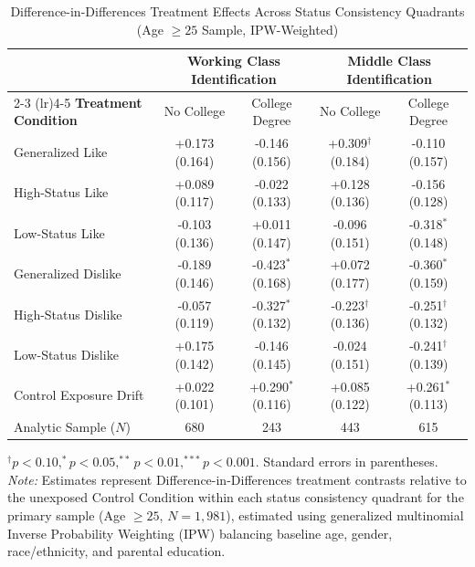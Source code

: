 \begin{table}[ht!]
\centering
\small
\caption{Difference-in-Differences Treatment Effects Across Status Consistency Quadrants (Age $\ge 25$ Sample, IPW-Weighted)}
\label{tbl:did_status_quadrants}
\setlength{\tabcolsep}{2.5pt}
\begin{tabular*}{\linewidth}{@{\extracolsep{\fill}}lcccc@{}}
\toprule
& \multicolumn{2}{c}{\textbf{Working Class Identification}} & \multicolumn{2}{c}{\textbf{Middle Class Identification}} \\
\cmidrule(lr){2-3} \cmidrule(lr){4-5}
\textbf{Treatment Condition} & No College & College Degree & No College & College Degree \\
\midrule
Generalized Like & +0.173 (0.164) & -0.146 (0.156) & +0.309$^{\dagger}$ (0.184) & -0.110 (0.157) \\
High-Status Like & +0.089 (0.117) & -0.022 (0.133) & +0.128 (0.136) & -0.156 (0.128) \\
Low-Status Like & -0.103 (0.136) & +0.011 (0.147) & -0.096 (0.151) & -0.318$^{*}$ (0.148) \\
Generalized Dislike & -0.189 (0.146) & -0.423$^{*}$ (0.168) & +0.072 (0.177) & -0.360$^{*}$ (0.159) \\
High-Status Dislike & -0.057 (0.119) & -0.327$^{*}$ (0.132) & -0.223$^{\dagger}$ (0.136) & -0.251$^{\dagger}$ (0.132) \\
Low-Status Dislike & +0.175 (0.142) & -0.146 (0.145) & -0.024 (0.151) & -0.241$^{\dagger}$ (0.139) \\
\midrule
Control Exposure Drift & +0.022 (0.101) & +0.290$^{*}$ (0.116) & +0.085 (0.122) & +0.261$^{*}$ (0.113) \\
Analytic Sample ($N$) & 680 & 243 & 443 & 615 \\
\bottomrule
\end{tabular*}
\begin{minipage}{\linewidth}
\vspace{4pt}
\footnotesize
$^{\dagger}p < 0.10, ^{*}p < 0.05, ^{**}p < 0.01, ^{***}p < 0.001$. Standard errors in parentheses. \newline
\textit{Note:} Estimates represent Difference-in-Differences treatment contrasts relative to the unexposed Control Condition within each status consistency quadrant for the primary sample (Age $\ge 25$, $N = 1{,}981$), estimated using generalized multinomial Inverse Probability Weighting (IPW) balancing baseline age, gender, race/ethnicity, and parental education.
\end{minipage}
\end{table}
